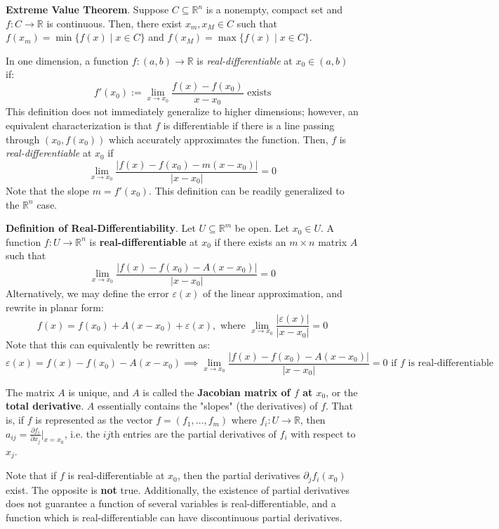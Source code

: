 \textbf{Extreme Value Theorem}. Suppose $C\subseteq\mathbb{R}^n$ is a nonempty, compact set and $f:C\to\mathbb{R}$ is continuous. Then, there exist $x_m,x_M\in C$ such that $f(x_m) = \min\{f(x)\mid x\in C\}$ and $f(x_M) = \max \{f(x)\mid x\in C\}$.

In one dimension, a function $f:(a,b)\to\mathbb{R}$ is \textit{real-differentiable} at $x_0\in(a,b)$ if: \[f'(x_0) := \lim_{x\to x_0} \frac{f(x)-f(x_0)}{x-x_0} \text{ \ exists}\] This definition does not immediately generalize to higher dimensions; however, an equivalent characterization is that $f$ is differentiable if there is a line passing through $(x_0,f(x_0))$ which accurately approximates the function. Then, $f$ is \textit{real-differentiable} at $x_0$ if \[\lim_{x\to x_0} \frac{|f(x)-f(x_0) - m(x-x_0)|}{|x-x_0|} = 0\] Note that the slope $m=f'(x_0)$. This definition can be readily generalized to the $\mathbb{R}^n$ case.

\textbf{Definition of Real-Differentiability}. Let $U\subseteq \mathbb{R}^m$ be open. Let $x_0\in U$. A function $f:U\to \mathbb{R}^n$ is \textbf{real-differentiable} at $x_0$ if there exists an $m\times n$ matrix $A$ such that \[\lim_{x\to x_0} \frac{|f(x)-f(x_0)-A(x-x_0)|}{|x-x_0|} = 0\] Alternatively, we may define the error $\varepsilon(x)$ of the linear approximation, and rewrite in planar form: \[f(x) = f(x_0) + A(x-x_0) + \varepsilon(x),\text{ where }\lim_{x\to x_0}\frac{|\varepsilon(x)|}{|x-x_0|} = 0\] Note that this can equivalently be rewritten as: \[\varepsilon(x) = f(x) - f(x_0) - A(x-x_0) \implies \lim_{x\to x_0}\frac{|f(x)-f(x_0)-A(x-x_0)|}{|x-x_0|} = 0 \text{ if }f\text{ is real-differentiable}\]

The matrix $A$ is unique, and $A$ is called the \textbf{Jacobian matrix of $f$ at $x_0$}, or the \textbf{total derivative}. $A$ essentially contains the "slopes" (the derivatives) of $f$. That is, if $f$ is represented as the vector $f=(f_1,\dots, f_m)$ where $f_i:U\to\mathbb{R}$, then $a_{ij} = \displaystyle\frac{\partial f_i}{\partial x_j} \bigg\rvert_{x=x_0}$, i.e. the $ij$th entries are the partial derivatives of $f_i$ with respect to $x_j$.

Note that if $f$ is real-differentiable at $x_0$, then the partial derivatives $\partial_j f_i(x_0)$ exist. The opposite is \textbf{not} true. Additionally, the existence of partial derivatives does not guarantee a function of several variables is real-differentiable, and a function which is real-differentiable can have discontinuous partial derivatives.

